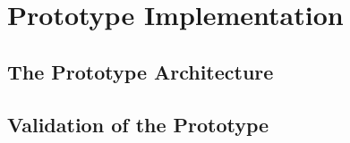 \section{Prototype Implementation}
\subsection*{The Prototype Architecture}
\subsection*{Validation of the Prototype}